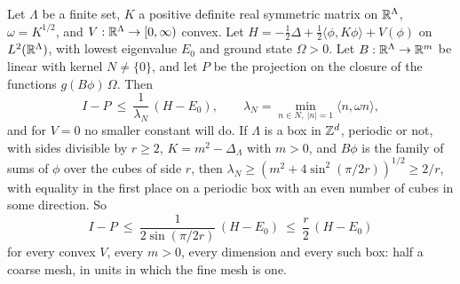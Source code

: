 \begin{proposition}\label{p:convex}
Let $\Lambda$ be a finite set, $K$ a positive definite real symmetric matrix on $\mathbb{R}^\Lambda$,
$\omega=K^{1/2}$, and $V:\mathbb{R}^\Lambda\to[0,\infty)$ convex. Let
$H=-\tfrac12\Delta+\tfrac12\langle\phi,K\phi\rangle+V(\phi)$ on $L^2(\mathbb{R}^\Lambda)$, with lowest eigenvalue
$E_0$ and ground state $\Omega>0$. Let $B:\mathbb{R}^\Lambda\to\mathbb{R}^m$ be linear with kernel $N\ne\{0\}$, and let $P$
be the projection on the closure of the functions $g(B\phi)\,\Omega$. Then
\[
I-P\ \le\ \frac1{\lambda_N}\,(H-E_0),\qquad \lambda_N=\min_{n\in N,\ |n|=1}\langle n,\omega n\rangle ,
\]
and for $V=0$ no smaller constant will do. If $\Lambda$ is a box in $\mathbb{Z}^d$, periodic or not, with sides
divisible by $r\ge2$, $K=m^2-\Delta_\Lambda$ with $m>0$, and $B\phi$ is the family of sums of $\phi$ over the
cubes of side $r$, then $\lambda_N\ge(m^2+4\sin^2(\pi/2r))^{1/2}\ge2/r$, with equality in the first place on
a periodic box with an even number of cubes in some direction. So
\[
I-P\ \le\ \frac1{2\sin(\pi/2r)}\,(H-E_0)\ \le\ \frac r2\,(H-E_0)
\]
for every convex $V$, every $m>0$, every dimension and every such box: half a coarse mesh, in units in which
the fine mesh is one.
\end{proposition}
